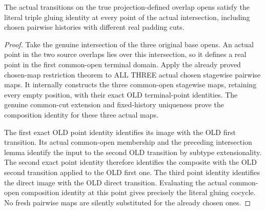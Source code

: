 \begin{theorem}
\label{hir:sharp-actual-endpoint-transition-cocycle}
\leanok
{}
The actual transitions on the true projection-defined overlap opens satisfy
the literal triple gluing identity at every point of the actual intersection,
including chosen pairwise histories with different real padding cuts.
\end{theorem}
\begin{proof}
Take the genuine intersection of the three original base opens. An actual
point in the two source overlaps lies over this intersection, so it defines
a real point in the first common-open terminal domain. Apply the already
proved chosen-map restriction theorem to ALL THREE actual chosen stagewise
pairwise maps. It internally constructs the three common-open stagewise maps,
retaining every empty position, with their exact OLD terminal-point identities.
The genuine common-cut extension and fixed-history uniqueness prove the
composition identity for these three actual maps.

The first exact OLD point identity identifies its image with the OLD first
transition. Its actual common-open membership and the preceding intersection
lemma identify the input to the second OLD transition by subtype
extensionality. The second exact point identity therefore identifies the
composite with the OLD second transition applied to the OLD first one. The
third point identity identifies the direct image with the OLD direct
transition. Evaluating the actual common-open composition identity at this
point gives precisely the literal gluing cocycle. No fresh pairwise maps are
silently substituted for the already chosen ones.
\end{proof}

